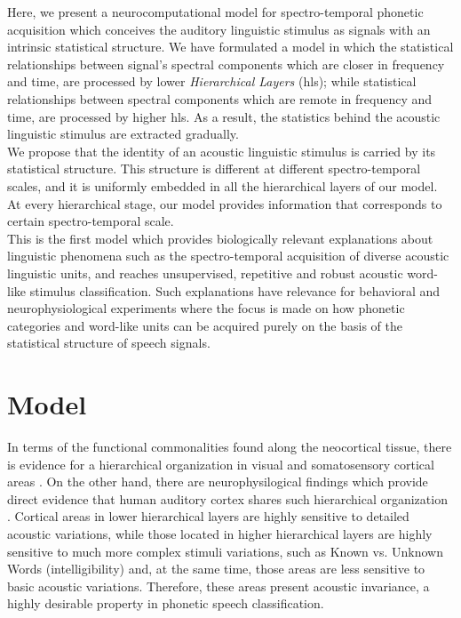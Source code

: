\documentclass[11pt,a4paper]{article}
\begin{document}
Here, we present a neurocomputational model for
spectro-temporal phonetic acquisition
which conceives the auditory linguistic stimulus
as signals with an intrinsic statistical structure.
We have formulated a model in which the statistical relationships between
signal's spectral components which are closer in frequency and time,
are processed by lower \textit{Hierarchical Layers} (\ac{hl}s);
while statistical relationships between spectral components
which are remote in frequency and time, are processed
by higher \ac{hl}s.
As a result, the statistics behind the acoustic linguistic
stimulus are extracted gradually.\\

We propose that the identity of an acoustic linguistic stimulus
is carried by its statistical structure.
This structure is different at different
spectro-temporal scales,
and it is uniformly embedded in all the hierarchical
layers of our model.
At every hierarchical stage, our model provides information that
corresponds to certain spectro-temporal scale.\\

This is the first model which provides biologically
relevant explanations about linguistic phenomena such as the spectro-temporal acquisition
of diverse acoustic linguistic units, and reaches unsupervised, repetitive
and robust acoustic word-like stimulus classification.
Such explanations have relevance for behavioral and
neurophysiological experiments where the focus is made
on how phonetic categories and word-like units can be
acquired purely on the basis of the statistical
structure of speech signals.\\















\section{Model} \label{Mod}

In terms of the functional commonalities
found along the neocortical tissue,
there is evidence for a hierarchical
organization in visual and somatosensory
cortical areas \cite{coogan93, iwamura98}.
On the other hand, there are neurophysilogical findings which provide
direct evidence that human auditory cortex shares
such hierarchical organization \cite{okada10, humphries14, wessinger01}.
Cortical areas in lower hierarchical layers are highly sensitive to
detailed acoustic variations, while those located in higher hierarchical layers
are highly sensitive to much more complex stimuli variations, such as
Known vs. Unknown Words (intelligibility) and, at the same time,
those areas are less sensitive to basic acoustic variations.
Therefore, these areas present acoustic invariance, a highly desirable property
in phonetic speech classification.\\
\end{document}
